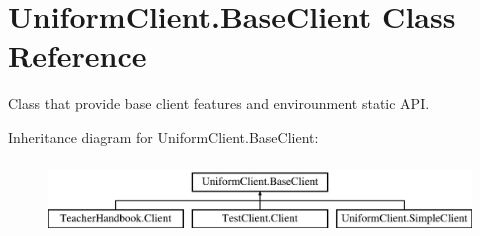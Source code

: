 \hypertarget{class_uniform_client_1_1_base_client}{}\section{Uniform\+Client.\+Base\+Client Class Reference}
\label{class_uniform_client_1_1_base_client}


Class that provide base client features and envirounment static A\+PI.  


Inheritance diagram for Uniform\+Client.\+Base\+Client\+:\begin{figure}[H]
\begin{center}
\leavevmode
\includegraphics[height=2.000000cm]{d4/deb/class_uniform_client_1_1_base_client}
\end{center}
\end{figure}

